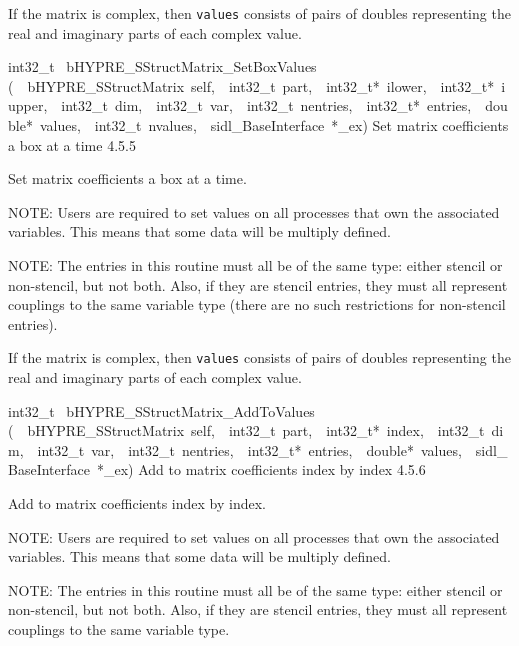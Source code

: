 \documentclass{article}
\begin{document}
\begin{cxxentry}
\begin{cxxentry}
\begin{cxxfunction}
\begin{cxxdoc}
If the matrix is complex, then {\tt values} consists of pairs
of doubles representing the real and imaginary parts of each
complex value.
\end{cxxdoc}
\end{cxxfunction}
\begin{cxxfunction}
{int32\_t\ }
        {bHYPRE\_SStructMatrix\_SetBoxValues}
        {(\ \ bHYPRE\_SStructMatrix\ self,\ \ int32\_t\ part,\ \ int32\_t*\ ilower,\ \ int32\_t*\ iupper,\ \ int32\_t\ dim,\ \ int32\_t\ var,\ \ int32\_t\ nentries,\ \ int32\_t*\ entries,\ \ double*\ values,\ \ int32\_t\ nvalues,\ \ sidl\_BaseInterface\ *\_ex)}
        {
Set matrix coefficients a box at a time}
        {4.5.5}
\begin{cxxdoc}

Set matrix coefficients a box at a time.

NOTE: Users are required to set values on all processes that
own the associated variables.  This means that some data will
be multiply defined.

NOTE: The entries in this routine must all be of the same
type: either stencil or non-stencil, but not both.  Also, if
they are stencil entries, they must all represent couplings
to the same variable type (there are no such restrictions for
non-stencil entries).

If the matrix is complex, then {\tt values} consists of pairs
of doubles representing the real and imaginary parts of each
complex value.
\end{cxxdoc}
\end{cxxfunction}
\begin{cxxfunction}
{int32\_t\ }
        {bHYPRE\_SStructMatrix\_AddToValues}
        {(\ \ bHYPRE\_SStructMatrix\ self,\ \ int32\_t\ part,\ \ int32\_t*\ index,\ \ int32\_t\ dim,\ \ int32\_t\ var,\ \ int32\_t\ nentries,\ \ int32\_t*\ entries,\ \ double*\ values,\ \ sidl\_BaseInterface\ *\_ex)}
        {
Add to matrix coefficients index by index}
        {4.5.6}
\begin{cxxdoc}

Add to matrix coefficients index by index.

NOTE: Users are required to set values on all processes that
own the associated variables.  This means that some data will
be multiply defined.

NOTE: The entries in this routine must all be of the same
type: either stencil or non-stencil, but not both.  Also, if
they are stencil entries, they must all represent couplings
to the same variable type.


\end{cxxdoc}
\end{cxxfunction}
\end{cxxentry}
\end{cxxentry}
\end{document}

